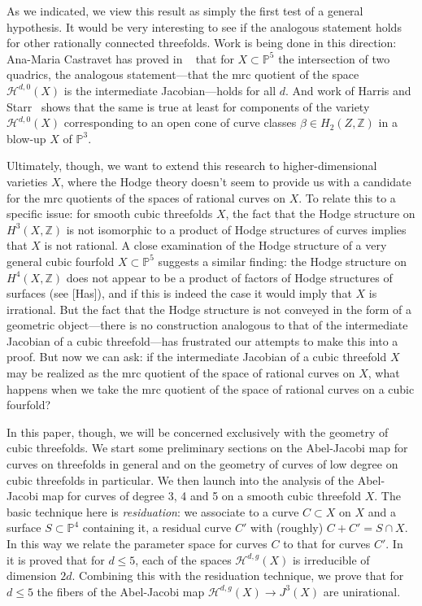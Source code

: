\documentclass[amssymb,twoside,12 pt,amscd,reqno]{amsart}
\theoremstyle{plain}
\theoremstyle{definition}
\newcommand{\Hdg}[2]{\mathcal{H}^{#1,#2}}
\def\P{{\mathbb P}}
\def\Z{{\mathbb Z}}
\def\ps{\vspace{4pt}}
\begin{document}
As we indicated, we view this result as simply the first test of a
general hypothesis. It would be very interesting to see if the
analogous statement holds for other rationally connected threefolds.
Work is being done in this direction: Ana-Maria Castravet has proved
in ~\cite{C} that for $X \subset \P^5$ the intersection of two quadrics, the
analogous statement---that the mrc quotient of the space
$\Hdg{d}{0}(X)$ is the intermediate Jacobian---holds for all $d$. And
work of Harris and Starr~\cite{HS} shows that the same is true at least
for components of the variety $\Hdg{d}{0}(X)$ corresponding to an open
cone of curve classes $\beta \in H_2(Z,\Z)$ in a blow-up $X$ of
$\P^3$.

\ps

Ultimately, though, we want to extend this research to
higher-dimensional varieties $X$, where the Hodge theory doesn't seem
to provide us with a candidate for the mrc quotients of the spaces of
rational curves on $X$. To relate this to a specific issue: for smooth
cubic threefolds $X$, the fact that the Hodge structure on $H^3(X,\Z)$
is not isomorphic to a product of Hodge structures of curves implies
that $X$ is not rational. A close examination of the Hodge structure
of a very general cubic fourfold $X \subset \P^5$ suggests a similar
finding: the Hodge structure on $H^4(X,\Z)$ does not appear to be a
product of factors of Hodge structures of surfaces (see [Has]), and if
this is indeed the case it would imply that $X$ is irrational. But the
fact that the Hodge structure is not conveyed in the form of a
geometric object---there is no construction analogous to that of the
intermediate Jacobian of a cubic threefold---has frustrated our
attempts to make this into a proof. But now we can ask: if the
intermediate Jacobian of a cubic threefold $X$ may be realized as the
mrc quotient of the space of rational curves on $X$, what happens when
we take the mrc quotient of the space of rational curves on a cubic
fourfold?

\ps

In this paper, though, we will be concerned exclusively with the
geometry of cubic threefolds. We start some preliminary sections on
the Abel-Jacobi map for curves on threefolds in general and on the
geometry of curves of low degree on cubic threefolds in particular. We
then launch into the analysis of the Abel-Jacobi map for curves of
degree 3, 4 and 5 on a smooth cubic threefold $X$. The basic technique
here is {\it residuation}: we associate to a curve $C \subset X$ on
$X$ and a surface $S \subset \P^4$ containing it, a residual curve
$C'$ with (roughly) $C +C' = S
\cap X$. 
In this way we relate the parameter space for curves $C$ to that for
curves $C'$.
In ~\cite{HRS1} it is proved
that for $d\leq 5$, each of the spaces $\Hdg{d}{g}(X)$ is
irreducible of dimension $2d$.  Combining this with the residuation
technique, we prove that for $d\leq 5$ the fibers of the Abel-Jacobi
map $\Hdg{d}{g}(X)\to J^3(X)$ are unirational.
\end{document}
